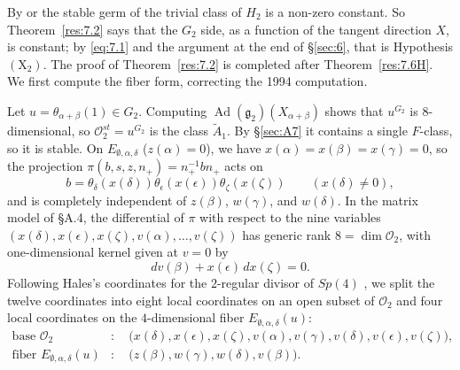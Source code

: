 \documentclass[12pt,letterpaper]{amsart}
\theoremstyle{plain}
\theoremstyle{definition}
\theoremstyle{remark}
\theoremstyle{definition}
\DeclareMathOperator{\Ad}{Ad}
\begin{document}
By \cite{Sh72} or \cite{Ro80} the stable germ of the trivial class of $H_2$ is
a non-zero constant. So Theorem~\ref{res:7.2} says that the $G_2$ side, as a
function of the tangent direction $X$, is constant; by \eqref{eq:7.1} and the
argument at the end of \S\ref{sec:6}, that is Hypothesis $(\mathrm X_2)$. The
proof of Theorem~\ref{res:7.2} is completed after Theorem~\ref{res:7.6H}. We
first compute the fiber form, correcting the 1994 computation.

Let $u=\theta_{\alpha+\beta }(1)\in G_2$. Computing
$\Ad({\mathfrak g}_2)(X_{\alpha+\beta })$ shows that $u^{G_2}$
is $8$-dimensional, so ${\mathcal O}_2^{st}=u^{G_2}$ is the class $\tilde A_1$.
By \S\ref{sec:A7} it contains a single $F$-class, so it is stable.
On $E_{\emptyset,\alpha,\delta}$ ($z(\alpha)=0$), we have
$x(\alpha)=x(\beta)=x(\gamma)=0$, so the projection
$\pi(b,s,z,n_+)=n_+^{-1}bn_+$ acts on
\[
b=\theta_\delta(x(\delta))\theta_\epsilon(x(\epsilon))\theta_\zeta(x(\zeta))
\qquad(x(\delta)\neq0),
\]
and is completely independent of $z(\beta)$, $w(\gamma)$,
and $w(\delta)$. In the matrix model of \S A.4, the differential of $\pi$ with
respect to the nine variables $(x(\delta),x(\epsilon),x(\zeta),v(\alpha),\dots,v(\zeta))$
has generic rank $8=\dim{\mathcal O}_2$, with one-dimensional kernel given at
$v=0$ by
\[
dv(\beta)+x(\epsilon)\,dx(\zeta)=0.
\]
Following Hales's coordinates for
the $2$-regular divisor of $Sp(4)$ \cite[\S6, pp.~239--240]{Ha89}, we split
the twelve coordinates into eight local coordinates on an open subset of
${\mathcal O}_2$ and four local coordinates on
the $4$-dimensional fiber $E_{\emptyset,\alpha,\delta}(u)$:
\begin{align*}
\text{base }{\mathcal O}_2&:\quad
\bigl(x(\delta),x(\epsilon),x(\zeta),v(\alpha),v(\gamma),v(\delta),v(\epsilon),v(\zeta)\bigr),\\
\text{fiber }E_{\emptyset,\alpha,\delta}(u)&:\quad
\bigl(z(\beta),w(\gamma),w(\delta),v(\beta)\bigr).
\end{align*}
\end{document}

